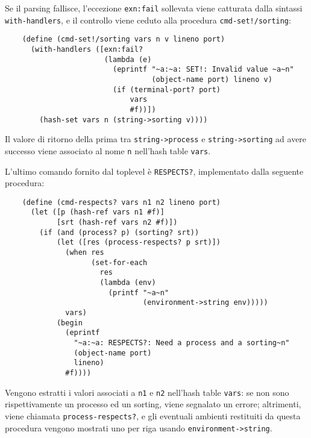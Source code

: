 Se il parsing fallisce, l'eccezione \lstinline{exn:fail} sollevata
viene catturata dalla sintassi \lstinline{with-handlers}, e il controllo
viene ceduto alla procedura \lstinline{cmd-set!/sorting}:

\begin{lstlisting}
    (define (cmd-set!/sorting vars n v lineno port)
      (with-handlers ([exn:fail?
                       (lambda (e)
                         (eprintf "~a:~a: SET!: Invalid value ~a~n"
                                  (object-name port) lineno v)
                         (if (terminal-port? port)
                             vars
                             #f))])
        (hash-set vars n (string->sorting v))))
\end{lstlisting}

Il valore di ritorno della prima tra \lstinline{string->process} e
\lstinline{string->sorting} ad avere successo viene associato al nome
\lstinline{n} nell'hash table \lstinline{vars}.

L'ultimo comando fornito dal toplevel \`e \lstinline{RESPECTS?},
implementato dalla seguente procedura:

\begin{lstlisting}
    (define (cmd-respects? vars n1 n2 lineno port)
      (let ([p (hash-ref vars n1 #f)]
            [srt (hash-ref vars n2 #f)])
        (if (and (process? p) (sorting? srt))
            (let ([res (process-respects? p srt)])
              (when res
                    (set-for-each
                      res
                      (lambda (env)
                        (printf "~a~n"
                                (environment->string env)))))
              vars)
            (begin
              (eprintf
                "~a:~a: RESPECTS?: Need a process and a sorting~n"
                (object-name port)
                lineno)
              #f))))
\end{lstlisting}

Vengono estratti i valori associati a \lstinline{n1} e \lstinline{n2}
nell'hash table \lstinline{vars}: se non sono rispettivamente un
processo ed un sorting, viene segnalato un errore; altrimenti, viene
chiamata \lstinline{process-respects?}, e gli eventuali ambienti
restituiti da questa procedura vengono mostrati uno per riga usando
\lstinline{environment->string}.
